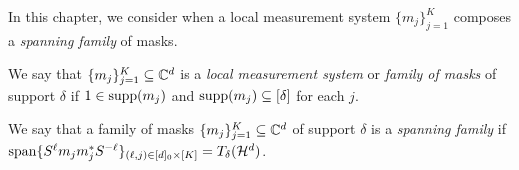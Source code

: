 In this chapter, we consider when a local measurement system $\{m_j\}_{j = 1}^K$ composes a \emph{spanning family} of masks.

\begin{definition}
  We say that $\{m_j\}_{j = 1}^K \subseteq \mathbb{C}^d$ is a \emph{local measurement system} or \emph{family of masks} of support $\delta$ if $1 \in \operatorname{supp}(m_j)$ and $\operatorname{supp}(m_j) \subseteq [\delta]$ for each $j$.
\end{definition}

\begin{definition}
  We say that a family of masks $\{m_j\}_{j = 1}^K \subseteq \mathbb{C}^d$ of support $\delta$ is a \emph{spanning family} if $\operatorname{span} \{S^\ell m_j m_j^* S^{-\ell}\}_{(\ell, j) \in [d]_0 \times [K]} = T_\delta(\mathcal{H}^d)$.
\end{definition}




